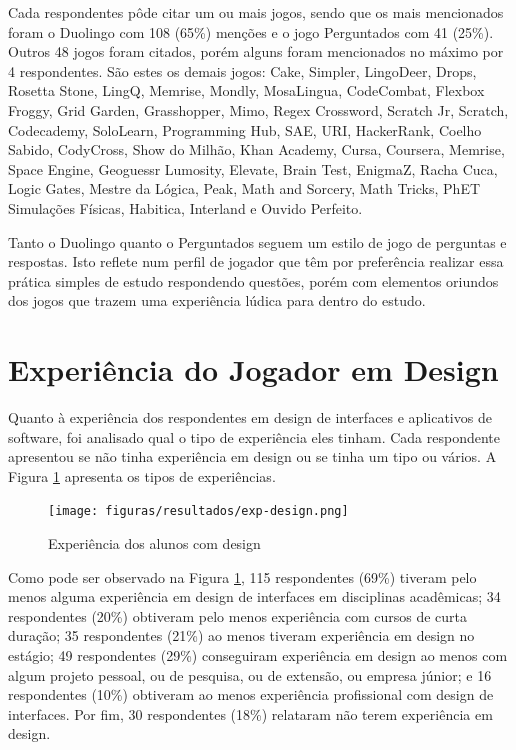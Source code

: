 Cada respondentes pôde citar um ou mais jogos, sendo que os mais mencionados foram o Duolingo com 108 (65\%) menções e o jogo Perguntados com 41 (25\%). Outros 48 jogos foram citados, porém alguns foram mencionados no máximo por 4 respondentes. São estes os demais jogos: Cake, Simpler, LingoDeer, Drops, Rosetta Stone, LingQ, Memrise, Mondly, MosaLingua, CodeCombat, Flexbox Froggy, Grid Garden, Grasshopper, Mimo, Regex Crossword, Scratch Jr, Scratch, Codecademy, SoloLearn, Programming Hub, SAE, URI, HackerRank, Coelho Sabido, CodyCross, Show do Milhão, Khan Academy, Cursa, Coursera, Memrise, Space Engine, Geoguessr
Lumosity, Elevate, Brain Test, EnigmaZ, Racha Cuca, Logic Gates, Mestre da Lógica, Peak, Math and Sorcery, Math Tricks, PhET Simulações Físicas, Habitica, Interland e Ouvido Perfeito.

Tanto o Duolingo quanto o Perguntados seguem um estilo de jogo de perguntas e respostas. Isto reflete num perfil de jogador que têm por preferência realizar essa prática simples de estudo respondendo questões, porém com elementos oriundos dos jogos que trazem uma experiência lúdica para dentro do estudo.

\section{Experiência do Jogador em Design}


Quanto à experiência dos respondentes em design de interfaces e aplicativos de software, foi analisado qual o tipo de experiência eles tinham. Cada respondente apresentou se não tinha experiência em design ou se tinha um tipo ou vários. A Figura \ref{Fig:exp-design.png} apresenta os tipos de experiências.  

\newpage

\begin{figure}[htbp]
	\centering
	\caption{Experiência dos alunos com design}
	\texttt{[image: figuras/resultados/exp-design.png]}
	\label{Fig:exp-design.png}
\end{figure}

Como pode ser observado na Figura \ref{Fig:exp-design.png}, 115 respondentes (69\%) tiveram pelo menos alguma experiência em design de interfaces em disciplinas acadêmicas; 34 respondentes (20\%) obtiveram pelo menos experiência com cursos de curta duração; 35 respondentes (21\%) ao menos tiveram experiência em design no estágio; 49 respondentes (29\%) conseguiram experiência em design ao menos com algum projeto pessoal, ou de pesquisa, ou de extensão, ou empresa júnior; e 16 respondentes (10\%) obtiveram ao menos experiência profissional com design de interfaces. Por fim, 30 respondentes (18\%) relataram não terem experiência em design.

